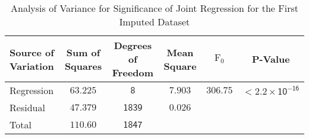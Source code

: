 \begin{table}[ht]
\centering
\begingroup\footnotesize
\caption{Analysis of Variance for Significance of Joint Regression for the First Imputed Dataset} 
\label{tab:anova1}
\begin{adjustbox}{width=\textwidth}
\begin{tabular}{lccccc}
\hline
\textbf{Source of Variation} & \textbf{Sum of Squares} & \textbf{Degrees of Freedom} & \textbf{Mean Square} & $\mathrm{F}_0$ & \textbf{P-Value} \\ 
\hline
Regression & $\mathsf{63.225}$ & $\mathsf{8}$ & $\mathsf{7.903}$ & $\mathsf{306.75}$ & $\mathsf{< 2.2\times 10^{-16}}$ \\
Residual & $\mathsf{47.379}$ & $\mathsf{1839}$ & $\mathsf{0.026}$ &  &  \\
Total & $\mathsf{110.60}$ & $\mathsf{1847}$ &  &  &  \\
\hline
\end{tabular}
\end{adjustbox}
\endgroup
\end{table}